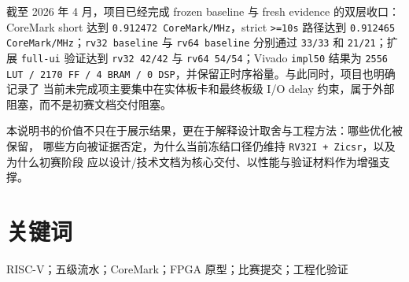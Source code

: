 截至 2026 年 4 月，项目已经完成 frozen baseline 与 fresh evidence 的双层收口：CoreMark short
达到 \texttt{0.912472 CoreMark/MHz}，strict \texttt{>=10s} 路径达到
\texttt{0.912465 CoreMark/MHz}；\texttt{rv32 baseline} 与 \texttt{rv64 baseline}
分别通过 \texttt{33/33} 和 \texttt{21/21}；扩展 \texttt{full-ui} 验证达到
\texttt{rv32 42/42} 与 \texttt{rv64 54/54}；Vivado \texttt{impl50} 结果为
\texttt{2556 LUT / 2170 FF / 4 BRAM / 0 DSP}，并保留正时序裕量。与此同时，项目也明确记录了
当前未完成项主要集中在实体板卡和最终板级 I/O delay 约束，属于外部阻塞，而不是初赛文档交付阻塞。

本说明书的价值不只在于展示结果，更在于解释设计取舍与工程方法：哪些优化被保留，
哪些方向被证据否定，为什么当前冻结口径仍维持 \texttt{RV32I + Zicsr}，以及为什么初赛阶段
应以设计/技术文档为核心交付、以性能与验证材料作为增强支撑。

\section*{关键词}

RISC-V；五级流水；CoreMark；FPGA 原型；比赛提交；工程化验证
\clearpage
